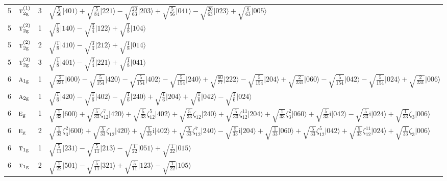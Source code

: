 \documentclass[11pt]{article}
\newcommand{\irr}[1]{\text{\normalfont\scshape #1}}
\newcommand{\ptag}[1]{\mathrm{#1}}
\newcommand{\iunit}{\mathrm{i}}
\newcommand{\rootunity}[1]{\zeta_{#1}}
\newcommand{\occ}[1]{\lvert #1\rangle}
\begin{document}
\begin{longtable}{c l c p{}}
5 & $\irr{t}_{2\ptag{g}}^{(1)}$ & 3 & $\sqrt{\tfrac{5}{56}}\occ{401}+\sqrt{\tfrac{5}{84}}\occ{221}-\sqrt{\tfrac{20}{63}}\occ{203}+\sqrt{\tfrac{5}{56}}\occ{041}-\sqrt{\tfrac{20}{63}}\occ{023}+\sqrt{\tfrac{8}{63}}\occ{005}$\\
5 & $\irr{t}_{2\ptag{g}}^{(2)}$ & 1 & $\sqrt{\tfrac{1}{8}}\occ{140}-\sqrt{\tfrac{3}{4}}\occ{122}+\sqrt{\tfrac{1}{8}}\occ{104}$\\
5 & $\irr{t}_{2\ptag{g}}^{(2)}$ & 2 & $\sqrt{\tfrac{1}{8}}\occ{410}-\sqrt{\tfrac{3}{4}}\occ{212}+\sqrt{\tfrac{1}{8}}\occ{014}$\\
5 & $\irr{t}_{2\ptag{g}}^{(2)}$ & 3 & $\sqrt{\tfrac{1}{8}}\occ{401}-\sqrt{\tfrac{3}{4}}\occ{221}+\sqrt{\tfrac{1}{8}}\occ{041}$\\
\hline
6 & $\irr{a}_{1\ptag{g}}$ & 1 & $\sqrt{\tfrac{2}{231}}\occ{600}-\sqrt{\tfrac{5}{154}}\occ{420}-\sqrt{\tfrac{5}{154}}\occ{402}-\sqrt{\tfrac{5}{154}}\occ{240}+\sqrt{\tfrac{60}{77}}\occ{222}-\sqrt{\tfrac{5}{154}}\occ{204}+\sqrt{\tfrac{2}{231}}\occ{060}-\sqrt{\tfrac{5}{154}}\occ{042}-\sqrt{\tfrac{5}{154}}\occ{024}+\sqrt{\tfrac{2}{231}}\occ{006}$\\
6 & $\irr{a}_{2\ptag{g}}$ & 1 & $\sqrt{\tfrac{1}{6}}\occ{420}-\sqrt{\tfrac{1}{6}}\occ{402}-\sqrt{\tfrac{1}{6}}\occ{240}+\sqrt{\tfrac{1}{6}}\occ{204}+\sqrt{\tfrac{1}{6}}\occ{042}-\sqrt{\tfrac{1}{6}}\occ{024}$\\
6 & $\irr{e}_{\ptag{g}}$ & 1 & $\sqrt{\tfrac{1}{33}}\occ{600}+\sqrt{\tfrac{5}{33}}\rootunity{12}^{7}\occ{420}+\sqrt{\tfrac{5}{33}}\rootunity{12}^{5}\occ{402}+\sqrt{\tfrac{5}{33}}\rootunity{12}\occ{240}+\sqrt{\tfrac{5}{33}}\rootunity{12}^{11}\occ{204}+\sqrt{\tfrac{1}{33}}\rootunity{3}^{2}\occ{060}+\sqrt{\tfrac{5}{33}}\iunit\occ{042}-\sqrt{\tfrac{5}{33}}\iunit\occ{024}+\sqrt{\tfrac{1}{33}}\rootunity{3}\occ{006}$\\
6 & $\irr{e}_{\ptag{g}}$ & 2 & $\sqrt{\tfrac{1}{33}}\rootunity{3}^{2}\occ{600}+\sqrt{\tfrac{5}{33}}\rootunity{12}\occ{420}+\sqrt{\tfrac{5}{33}}\iunit\occ{402}+\sqrt{\tfrac{5}{33}}\rootunity{12}^{7}\occ{240}-\sqrt{\tfrac{5}{33}}\iunit\occ{204}+\sqrt{\tfrac{1}{33}}\occ{060}+\sqrt{\tfrac{5}{33}}\rootunity{12}^{5}\occ{042}+\sqrt{\tfrac{5}{33}}\rootunity{12}^{11}\occ{024}+\sqrt{\tfrac{1}{33}}\rootunity{3}\occ{006}$\\
6 & $\irr{t}_{1\ptag{g}}$ & 1 & $\sqrt{\tfrac{5}{11}}\occ{231}-\sqrt{\tfrac{5}{11}}\occ{213}-\sqrt{\tfrac{1}{22}}\occ{051}+\sqrt{\tfrac{1}{22}}\occ{015}$\\
6 & $\irr{t}_{1\ptag{g}}$ & 2 & $\sqrt{\tfrac{1}{22}}\occ{501}-\sqrt{\tfrac{5}{11}}\occ{321}+\sqrt{\tfrac{5}{11}}\occ{123}-\sqrt{\tfrac{1}{22}}\occ{105}$\\

\end{longtable}
\end{document}
